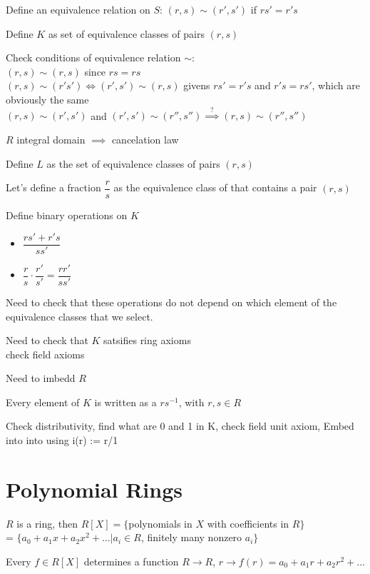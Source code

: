 \documentclass[10pt]{article}
\begin{document}
Define an equivalence relation on $S$: $(r, s) \sim (r', s')$ if $rs' = r's$

Define $K$ as set of equivalence classes of pairs $(r, s)$

Check conditions of equivalence relation $\sim$: \\
$(r, s) \sim (r, s)$ since $rs = rs$\\
$(r, s) \sim (r' s') \iff (r', s') \sim (r, s)$ givens $rs' = r's$ and $r's = rs'$, which are obviously the same\\
$(r, s) \sim (r', s')$ and $(r', s') \sim (r'', s'') \stackrel{?}{\implies} (r, s) \sim (r'', s'')$

$R$ integral domain $\implies$ cancelation law

Define $L$ as the set of equivalence classes of pairs $(r, s)$

Let's define a fraction $\dfrac{r}{s}$ as the equivalence class of that contains a pair $(r, s)$

Define binary operations on $K$
\begin{itemize}
    \item $\dfrac{rs' + r's}{ss'}$
    \item $\dfrac{r}{s}\cdot \dfrac{r'}{s'} = \dfrac{rr'}{ss'}$
\end{itemize}
Need to check that these operations do not depend on which element of the equivalence classes that we select. 

Need to check that $K$ satsifies ring axioms\\
check field axioms

Need to imbedd $R$

Every element of $K$ is written as a $rs^{-1}$, with $r,s \in R$

Check distributivity, find what are 0 and 1 in K, check field unit axiom, Embed into into using i(r) := r/1

\section{Polynomial Rings}
\begin{defn}
    $R$ is a ring, then $R[X] = \{$polynomials in $X$ with coefficients in $R\}$\\
    = $\{a_0 + a_1x + a_2x^2 + \ldots | a_i \in R$, finitely many nonzero $a_i\}$
\end{defn}

Every $f\in R[X]$ determines a function $R\to R$, $r \to f(r) = a_0 + a_1r + a_2r^2 + \ldots$
\end{document}
